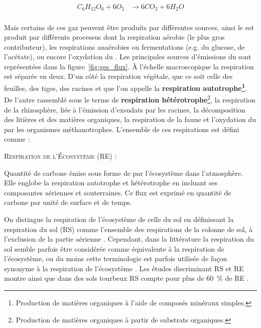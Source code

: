 $$\begin{aligned}\label{eq:respi}
C_{6}H_{12}O_{6} + 6O_{2} &\rightarrow 6CO_{2} + 6H_{2}O \\
\end{aligned} $$

Mais certains de ces gaz peuvent être produits par différentes sources, ainsi le \coo est produit par différents processus dont la respiration aérobie (le plus gros contributeur), les respirations anaérobies ou fermentations (e.g. du glucose, de l'acétate), ou encore l'oxydation du \chh.
Les principales sources d'émissions du \coo sont représentées dans la figure~\ref{fig:ges_flux}.
À l'échelle macroscopique la respiration est séparée en deux.
D'un côté la respiration végétale, que ce soit celle des feuilles, des tiges, des racines et que l'on appelle la \textbf{respiration autotrophe\footnote{Production de matières organiques à l'aide de composés minéraux simples.}}.
De l'autre rassemblé sous le terme de \textbf{respiration hétérotrophe}\footnote{Production de matières organiques à partir de substrats organiques.}, la respiration de la rhizosphère, liée à l'émission d'exsudats par les racines, la décomposition des litières et des matières organiques, la respiration de la faune et l'oxydation du \chh par les organismes méthanotrophes.
L'ensemble de ces respirations est défini comme : 
\begin{pdef}
\textsc{Respiration de l'Écosystème (RE)} :

Quantité de carbone émise sous forme de \coo par l'écosystème dans l'atmosphère. 
Elle englobe la respiration autotrophe et hétérotrophe en incluant ses composantes aériennes et souterraines.
Ce flux est exprimé en quantité de carbone par unité de surface et de temps.
\end{pdef}
On distingue la respiration de l'écosystème de celle du sol en définissant la respiration du sol (RS) comme l'ensemble des respirations de la colonne de sol, à l'exclusion de la partie aérienne \citep{luo20063}.
Cependant, dans la littérature la respiration du sol semble parfois être considérée comme équivalente à la respiration de l'écosystème, ou du moins cette terminologie est parfois utilisée de façon synonyme à la respiration de l'écosystème \citep{raich1992}.
Les études discriminant RS et RE montre ainsi que dans des sols tourbeux RS compte pour plus de \SI{60}{\percent} de RE \cite{lohila2003}.
%
